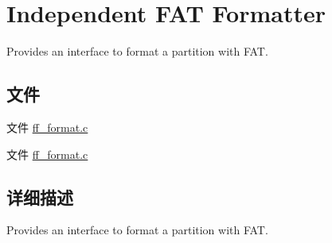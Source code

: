 \hypertarget{group___f_o_r_m_a_t}{}\section{Independent F\+AT Formatter}
\label{group___f_o_r_m_a_t}


Provides an interface to format a partition with F\+AT.  


\subsection*{文件}
\begin{DoxyCompactItemize}
\item 
文件 \hyperlink{ff__format_8c}{ff\+\_\+format.\+c}
\item 
文件 \hyperlink{ff__format_8c}{ff\+\_\+format.\+c}
\end{DoxyCompactItemize}


\subsection{详细描述}
Provides an interface to format a partition with F\+AT. 

